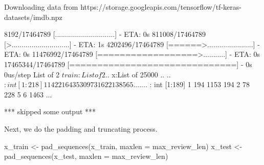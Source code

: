 \documentclass[
  12pt,
]{krantz}
\makeatletter
\newenvironment{Shaded}{\begin{snugshade}}{\end{snugshade}}
\newcommand{\AttributeTok}[1]{\textcolor[rgb]{0.61,0.61,0.61}{#1}}
\newcommand{\FunctionTok}[1]{\textcolor[rgb]{0,0,0}{#1}}
\newcommand{\NormalTok}[1]{#1}
\newcommand{\OtherTok}[1]{\textcolor[rgb]{0.37,0.37,0.37}{#1}}
\newcommand{\SpecialCharTok}[1]{\textcolor[rgb]{0,0,0}{#1}}
\newenvironment{kframe}{%
\medskip{}
\setlength{\fboxsep}{.8em}
 \def\at@end@of@kframe{}%
 \ifinner\ifhmode%
  \def\at@end@of@kframe{\end{minipage}}%
  \begin{minipage}{\columnwidth}%
 \fi\fi%
 \def\FrameCommand##1{\hskip\@totalleftmargin \hskip-\fboxsep
 \colorbox{shadecolor}{##1}\hskip-\fboxsep
     \hskip-\linewidth \hskip-\@totalleftmargin \hskip\columnwidth}%
 \MakeFramed {\advance\hsize-\width
   \@totalleftmargin\z@ \linewidth\hsize
   \@setminipage}}%
 {\par\unskip\endMakeFramed%
 \at@end@of@kframe}
\renewenvironment{Shaded}{\begin{kframe}}{\end{kframe}}
\makeatother
\begin{document}
\begin{Shaded}
\begin{Highlighting}[]
\NormalTok{Downloading data from}
\NormalTok{https://storage.googleapis.com/tensorflow/tf{-}keras{-}datasets/imdb.npz}

\NormalTok{    8192/17464789 [..............................] {-} ETA: 0s}
\NormalTok{  811008/17464789 [\textgreater{}.............................] {-} ETA: 1s}
\NormalTok{ 4202496/17464789 [======\textgreater{}.......................] {-} ETA: 0s}
\NormalTok{11476992/17464789 [==================\textgreater{}...........] {-} ETA: 0s}
\NormalTok{17465344/17464789 [==============================] {-} 0s 0us/step}
\NormalTok{List of 2}
\NormalTok{ $ train:List of 2}
\NormalTok{  ..$ x:List of 25000}
\NormalTok{  .. ..$ : int [1:218] 1 14 22 16 43 530 973 1622 1385 65 ...}
\NormalTok{  .. ..$ : int [1:189] 1 194 1153 194 2 78 228 5 6 1463 ...}

\NormalTok{*** skipped some output ***}
\end{Highlighting}
\end{Shaded}

\begin{Shaded}
\end{Shaded}

Next, we do the padding and truncating process.

\begin{Shaded}
\begin{Highlighting}[]
\NormalTok{x\_train }\OtherTok{\textless{}{-}} \FunctionTok{pad\_sequences}\NormalTok{(x\_train, }\AttributeTok{maxlen =}\NormalTok{ max\_review\_len)}
\NormalTok{x\_test }\OtherTok{\textless{}{-}} \FunctionTok{pad\_sequences}\NormalTok{(x\_test, }\AttributeTok{maxlen =}\NormalTok{ max\_review\_len)}
\end{Highlighting}
\end{Shaded}
\end{document}
